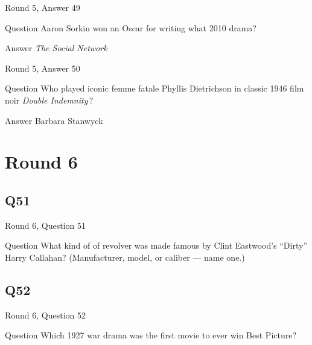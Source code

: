 \documentclass[11pt]{beamer}
\begin{document}
\begin{frame}[t]{Round 5, Answer 49}
\vspace{2em}
\begin{block}{Question}
Aaron Sorkin won an Oscar for writing what 2010 drama?
\end{block}
\pause{}
\begin{block}{Answer}
\emph{The Social Network}
\end{block}
\end{frame}
    

\begin{frame}[t]{Round 5, Answer 50}
\vspace{2em}
\begin{block}{Question}
Who played iconic femme fatale Phyllis Dietrichson in classic 1946 film noir \emph{Double Indemnity}\,?
\end{block}
\pause{}
\begin{block}{Answer}
Barbara Stanwyck
\end{block}
\end{frame}
    

\section{Round 6}
    

\subsection*{Q51}
\begin{frame}[t]{Round 6, Question 51}
\vspace{2em}
\begin{block}{Question}
What kind of of revolver was made famous by Clint Eastwood's ``Dirty'' Harry Callahan? (Manufacturer, model, or caliber — name one.)
\end{block}
\end{frame}
    

\subsection*{Q52}
\begin{frame}[t]{Round 6, Question 52}
\vspace{2em}
\begin{block}{Question}
Which 1927 war drama was the first movie to ever win Best Picture?
\end{block}
\end{frame}
    
\end{document}

